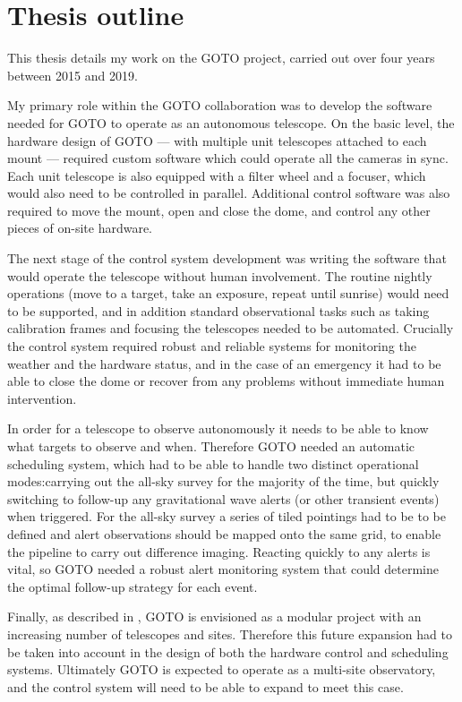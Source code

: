 \section{Thesis outline}
\label{sec:outline}
\begin{colsection}

This thesis details my work on the GOTO project, carried out over four years between 2015 and 2019.

My primary role within the GOTO collaboration was to develop the software needed for GOTO to operate as an autonomous telescope. On the basic level, the hardware design of GOTO --- with multiple unit telescopes attached to each mount --- required custom software which could operate all the cameras in sync. Each unit telescope is also equipped with a filter wheel and a focuser, which would also need to be controlled in parallel. Additional control software was also required to move the mount, open and close the dome, and control any other pieces of on-site hardware.

The next stage of the control system development was writing the software that would operate the telescope without human involvement. The routine nightly operations (move to a target, take an exposure, repeat until sunrise) would need to be supported, and in addition standard observational tasks such as taking calibration frames and focusing the telescopes needed to be automated. Crucially the control system required robust and reliable systems for monitoring the weather and the hardware status, and in the case of an emergency it had to be able to close the dome or recover from any problems without immediate human intervention.

In order for a telescope to observe autonomously it needs to be able to know what targets to observe and when. Therefore GOTO needed an automatic scheduling system, which had to be able to handle two distinct operational modes:\@ carrying out the all-sky survey for the majority of the time, but quickly switching to follow-up any gravitational wave alerts (or other transient events) when triggered. For the all-sky survey a series of tiled pointings had to be to be defined and alert observations should be mapped onto the same grid, to enable the pipeline to carry out difference imaging. Reacting quickly to any alerts is vital, so GOTO needed a robust alert monitoring system that could determine the optimal follow-up strategy for each event.

Finally, as described in , GOTO is envisioned as a modular project with an increasing number of telescopes and sites. Therefore this future expansion had to be taken into account in the design of both the hardware control and scheduling systems. Ultimately GOTO is expected to operate as a multi-site observatory, and the control system will need to be able to expand to meet this case.


\end{colsection}
